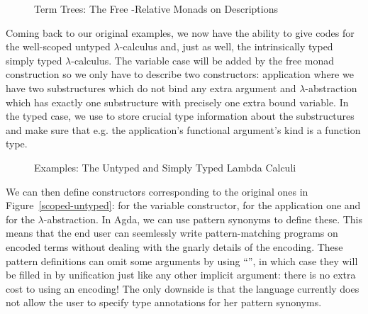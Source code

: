 \begin{figure}[h]
\begin{minipage}{0.55\textwidth}
\end{minipage}\hspace{2em}
\begin{minipage}{0.35\textwidth}
\end{minipage}
\caption{Term Trees: The Free -Relative Monads on Descriptions}
\end{figure}

Coming back to our original examples, we now have the ability to give
codes for the well-scoped untyped $\lambda$-calculus and, just as well,
the intrinsically typed simply typed $\lambda$-calculus.
The variable case will be added by the free monad construction so we
only have to describe two constructors: application where we have two
substructures which do not bind any extra argument and $\lambda$-abstraction
which has exactly one substructure with precisely one extra bound variable.
In the typed case, we use  to store crucial type information about
the substructures and make sure that e.g. the application's functional
argument's kind is a function type.

\begin{figure}[h]
\begin{minipage}{0.40\textwidth}
\end{minipage}\hspace{2em}
\begin{minipage}{0.50\textwidth}
\end{minipage}
\caption{Examples: The Untyped and Simply Typed Lambda Calculi}
\end{figure}

We can then define constructors corresponding
to the original ones in Figure~\ref{scoped-untyped}: 
for  the variable constructor,  for  the
application one and  for  the $\lambda$-abstraction.
In Agda, we can use pattern synonyms to define these. This means that
the end user can seemlessly write pattern-matching programs on encoded
terms without dealing with the gnarly details of the encoding.
These pattern definitions can omit some arguments by using ``\AS{\_}'',
in which case they will be filled in by unification just like any other
implicit argument: there is no extra cost to using an encoding!
The only downside is that the language currently does not allow the
user to specify type annotations for her pattern synonyms.

